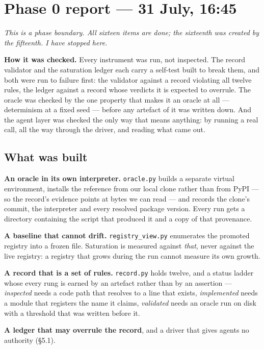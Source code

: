 \documentclass[11pt,a4paper]{article}
\newcommand{\code}[1]{\texttt{#1}}
\begin{document}
\section{Phase 0 report --- 31 July, 16:45}\label{sec:p0report}

\emph{This is a phase boundary. All sixteen items are done; the sixteenth was created by the
fifteenth. I have stopped here.}

\textbf{How it was checked.} Every instrument was run, not inspected. The record validator and the
saturation ledger each carry a self-test built to break them, and both were run to failure first:
the validator against a record violating all twelve rules, the ledger against a record whose
verdicts it is expected to overrule. The oracle was checked by the one property that makes it an
oracle at all --- determinism at a fixed seed --- before any artefact of it was written down. And
the agent layer was checked the only way that means anything: by running a real call, all the way
through the driver, and reading what came out.

\subsection{What was built}

\textbf{An oracle in its own interpreter.} \code{oracle.py} builds a separate virtual environment,
installs the reference from our local clone rather than from PyPI --- so the record's evidence
points at bytes we can read --- and records the clone's commit, the interpreter and every resolved
package version. Every run gets a directory containing the script that produced it and a copy of
that provenance.

\textbf{A baseline that cannot drift.} \code{registry\_view.py} enumerates the promoted registry
into a frozen file. Saturation is measured against \emph{that}, never against the live registry: a
registry that grows during the run cannot measure its own growth.

\textbf{A record that is a set of rules.} \code{record.py} holds twelve, and a status ladder whose
every rung is earned by an artefact rather than by an assertion --- \emph{inspected} needs a code
path that resolves to a line that exists, \emph{implemented} needs a module that registers the name
it claims, \emph{validated} needs an oracle run on disk with a threshold that was written before it.

\textbf{A ledger that may overrule the record}, and a driver that gives agents no authority
(\S5.1).
\end{document}
